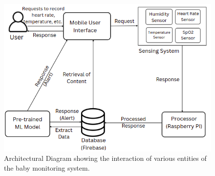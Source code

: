 \documentclass[12pt,a4paper]{report}
\begin{document}
\begin{figure}[hbtp]
  \centering
  \includegraphics[scale=0.6]{./pic/architecture.png}
  \caption{Architectural Diagram showing the interaction of various entities of the baby monitoring system.}
  \label{fig:architecture}
\end{figure}
\end{document}
